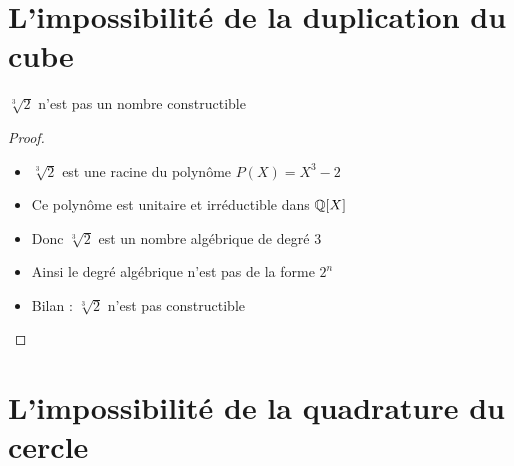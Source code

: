 \section{L'impossibilité de la duplication du cube}

\begin{frame}


\end{frame}


\begin{frame}

\bigskip

\begin{center}
\end{center}

\pause
\begin{theoreme}
$\sqrt[3]{2}$ n'est pas un nombre constructible
\end{theoreme}

\pause
\begin{proof}
\begin{itemize}[<+->]
  \item $\sqrt[3]{2}$ est une racine du polynôme $P(X)=X^3-2$
  \item Ce polynôme est unitaire et irréductible dans $\mathbb{Q}[X]$
  \item Donc $\sqrt[3]{2}$ est un nombre algébrique de degré $3$
  \item Ainsi le degré algébrique n'est pas de la forme $2^n$
  \item Bilan : $\sqrt[3]{2}$ n'est pas constructible \qedhere
\end{itemize}

\end{proof}
\end{frame}


\section{L'impossibilité de la quadrature du cercle}


\begin{frame}


\begin{center}
\end{center}
\end{frame}

